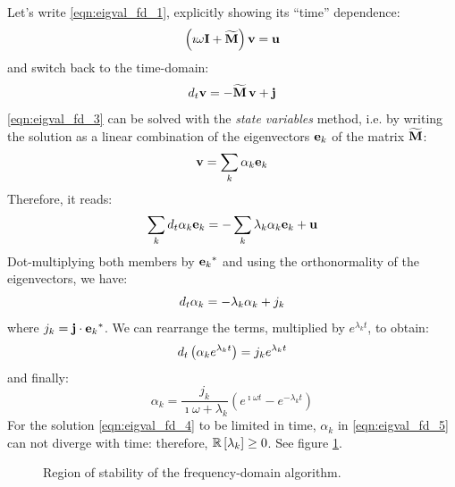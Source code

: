 Let's write \eqref{eqn:eigval_fd_1}, explicitly showing its ``time''
dependence:
\begin{equation} \label{eqn:eigval_fd_2}
  \left( \imath \omega \mathbf{I} + \widetilde{\mathbf{M}} \right) \mathbf{v} = \mathbf{u}
\end{equation}
and switch back to the time-domain:
\begin{equation} \label{eqn:eigval_fd_3}
  d_t \mathbf{v} = -{\widetilde{\mathbf{M}}\,\mathbf{v}} + \mathbf{j}
\end{equation}
\eqref{eqn:eigval_fd_3} can be solved with the \emph{state variables}
method, i.e. by writing the solution as a linear combination of the
eigenvectors $\mathbf{e}_k$ of the matrix $\widetilde{\mathbf{M}}$:
\begin{equation} \label{eqn:eigval_fd_4}
  \mathbf{v} = \sum_k \alpha_k \mathbf{e}_k
\end{equation}
Therefore, it reads:
\begin{equation*}
  \sum_k d_t \alpha_k \mathbf{e}_k = -\sum_k \lambda_k \alpha_k
  \mathbf{e}_k + \mathbf{u}
\end{equation*}
Dot-multiplying both members by ${{\mathbf{e}_k}^*}$ and using the
orthonormality of the eigenvectors, we have:
\begin{equation*}
  d_t \alpha_k = -\lambda_k \alpha_k + j_k
\end{equation*}
where $j_k = {\mathbf{j} \cdot {{\mathbf{e}_k}^*}}$. We can
rearrange the terms, multiplied by $e^{\lambda_k t}$, to obtain:
\begin{equation*}
  d_t \left( \alpha_k e^{\lambda_k t} \right) = j_k e^{\lambda_k t}
\end{equation*}
and finally:
\begin{equation*} \label{eqn:eigval_fd_5}
  \alpha_k = \frac{j_k}{\imath \omega + \lambda_k} \left( e^{\imath
  \omega t} - e^{-\lambda_k t} \right)
\end{equation*}
For the solution \eqref{eqn:eigval_fd_4} to be limited in time,
$\alpha_k$ in \eqref{eqn:eigval_fd_5} can not diverge with
time: therefore, ${\mathbb{R}\left[\lambda_k\right]} \geq 0$. See figure \ref{fig:stability_fd}.

\begin{figure}[htbp]
  \begin{center}
    \resizebox{8cm}{!}{}
  \end{center}
  \caption{Region of stability of the frequency-domain algorithm.}
  \label{fig:stability_fd}
\end{figure}

